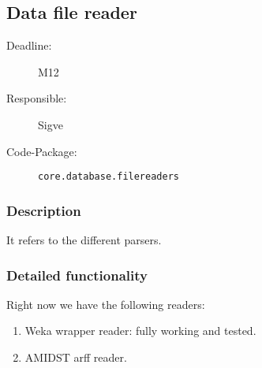 \subsection{Data file reader}
\label{DataFileReader:ID}

\begin{description}
\item[Deadline:] M12
\item[Responsible:] Sigve
\item[Code-Package:] \texttt{core.database.filereaders}
\end{description}

\subsubsection*{Description}

It refers to the different parsers. 

\subsubsection*{Detailed functionality}

Right now we have the following readers:

\begin{enumerate}
\item Weka wrapper reader: fully working and tested.
\item AMIDST arff reader.
\end{enumerate}


